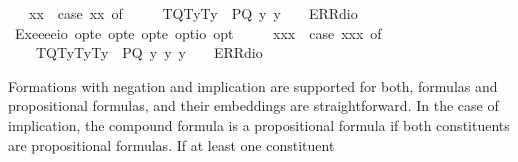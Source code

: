 \begin{isabellebody}
\ \ \ {\isachardoublequoteopen}{\isasymlparr}{\isasymPhi}{\isacharcomma}x{}{\isacharcomma}x{}{\isasymrparr}\ {\isasymequiv}\ case\ {\isacharparenleft}{\isasymPhi}{\isacharcomma}x{}{\isacharcomma}x{}{\isacharparenright}\ of\ \isanewline
\ \ \ \ {\isacharparenleft}T{\isacharparenleft}Q{\isacharparenright}{\isacharcomma}T{\isacharparenleft}y{}{\isacharparenright}{\isacharcomma}T{\isacharparenleft}y{}{\isacharparenright}{\isacharparenright}\ {\isasymRightarrow}\ P{\isacharparenleft}Q\ y{}\ y{}{\isacharparenright}\ {\isacharbar}\ {\isacharunderscore}\ {\isasymRightarrow}\ ERR{\isacharparenleft}dio{\isacharparenright}{\isachardoublequoteclose}\isanewline
\ \isamarkupfalse%
\ Exe{}{\isacharcolon}{\isacharcolon}{\isachardoublequoteopen}{\isacharparenleft}e{\isasymRightarrow}e{\isasymRightarrow}e{\isasymRightarrow}io{\isacharparenright}\ opt{\isasymRightarrow}e\ opt{\isasymRightarrow}e\ opt{\isasymRightarrow}e\ opt{\isasymRightarrow}io\ opt{\isachardoublequoteclose}\ {\isacharparenleft}{\isachardoublequoteopen}{\isasymlparr}{\isacharunderscore}{\isacharcomma}{\isacharunderscore}{\isacharcomma}{\isacharunderscore}{\isacharcomma}{\isacharunderscore}{\isasymrparr}{\isachardoublequoteclose}{\isacharparenright}\ \isanewline
\ \ \ {\isachardoublequoteopen}{\isasymlparr}{\isasymPhi}{\isacharcomma}x{}{\isacharcomma}x{}{\isacharcomma}x{}{\isasymrparr}\ {\isasymequiv}\ case\ {\isacharparenleft}{\isasymPhi}{\isacharcomma}x{}{\isacharcomma}x{}{\isacharcomma}x{}{\isacharparenright}\ of\ \isanewline
\ \ \ \ {\isacharparenleft}T{\isacharparenleft}Q{\isacharparenright}{\isacharcomma}T{\isacharparenleft}y{}{\isacharparenright}{\isacharcomma}T{\isacharparenleft}y{}{\isacharparenright}{\isacharcomma}T{\isacharparenleft}y{}{\isacharparenright}{\isacharparenright}\ {\isasymRightarrow}\ P{\isacharparenleft}Q\ y{}\ y{}\ y{}{\isacharparenright}\ {\isacharbar}\ {\isacharunderscore}\ {\isasymRightarrow}\ ERR{\isacharparenleft}dio{\isacharparenright}{\isachardoublequoteclose}%
\begin{isamarkuptext}%
Formations with negation and implication are supported for both, formulas and propositional
  formulas, and their embeddings are straightforward. In the case of implication, the compound formula
  is a propositional formula if both constituents are propositional formulas. If at least one constituent 

\end{isamarkuptext}
\end{isabellebody}
